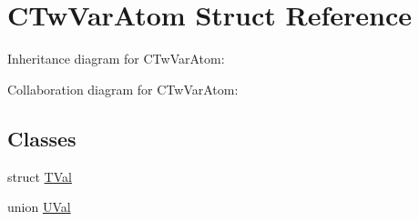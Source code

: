 \hypertarget{struct_c_tw_var_atom}{\section{C\+Tw\+Var\+Atom Struct Reference}
\label{struct_c_tw_var_atom}
}


Inheritance diagram for C\+Tw\+Var\+Atom\+:


Collaboration diagram for C\+Tw\+Var\+Atom\+:
\subsection*{Classes}
\begin{DoxyCompactItemize}
\item 
struct \hyperlink{struct_c_tw_var_atom_1_1_t_val}{T\+Val}
\item 
union \hyperlink{union_c_tw_var_atom_1_1_u_val}{U\+Val}
\end{DoxyCompactItemize}
